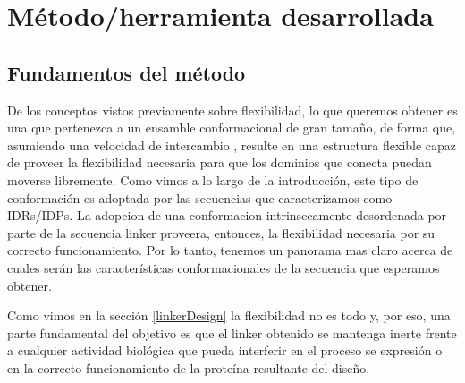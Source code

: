 
\chapter{Método/herramienta desarrollada}
\label{method}


\section{Fundamentos del método}


De los conceptos vistos previamente sobre flexibilidad, 
lo que queremos obtener es una   que pertenezca a un ensamble conformacional de gran tamaño, de forma que, asumiendo una velocidad de intercambio , resulte en una estructura flexible capaz de
proveer la flexibilidad necesaria para que los dominios que conecta puedan moverse libremente.
Como vimos a lo largo de la introducción, este tipo de conformación es adoptada por las secuencias que caracterizamos como IDRs/IDPs.
La adopcion de una conformacion intrinsecamente desordenada por parte de la secuencia linker proveera, entonces, la flexibilidad necesaria por su correcto funcionamiento.
Por lo tanto, tenemos un panorama mas claro acerca de cuales serán las características conformacionales de la secuencia que esperamos obtener.

Como vimos en la sección \ref{linkerDesign} la flexibilidad no es todo y, por eso, una parte fundamental del objetivo es que el linker obtenido se mantenga inerte frente a cualquier actividad biológica que pueda 
interferir en el proceso se expresión o en la correcto funcionamiento de la proteína resultante del diseño.


% 



